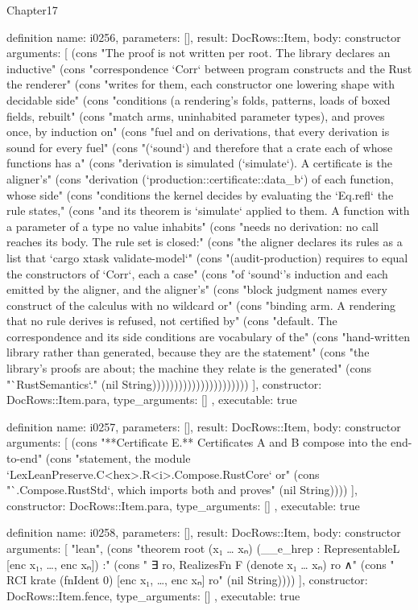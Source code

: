 \begin{lexlean}{Chapter17}
\begin{semanticmodule}
definition{
  name: i0256,
  parameters: [],
  result: DocRows::Item,
  body: constructor{
    arguments: [
      (cons "The proof is not written per root. The library declares an inductive" (cons "correspondence `Corr` between program constructs and the Rust the renderer" (cons "writes for them, each constructor one lowering shape with decidable side" (cons "conditions (a rendering's folds, patterns, loads of boxed fields, rebuilt" (cons "match arms, uninhabited parameter types), and proves once, by induction on" (cons "fuel and on derivations, that every derivation is sound for every fuel" (cons "(`sound`) and therefore that a crate each of whose functions has a" (cons "derivation is simulated (`simulate`). A certificate is the aligner's" (cons "derivation (`production::certificate::data_b`) of each function, whose side" (cons "conditions the kernel decides by evaluating the `Eq.refl` the rule states," (cons "and its theorem is `simulate` applied to them. A function with a parameter of a type no value inhabits" (cons "needs no derivation: no call reaches its body. The rule set is closed:" (cons "the aligner declares its rules as a list that `cargo xtask validate-model`" (cons "(audit-production) requires to equal the constructors of `Corr`, each a case" (cons "of `sound`'s induction and each emitted by the aligner, and the aligner's" (cons "block judgment names every construct of the calculus with no wildcard or" (cons "binding arm. A rendering that no rule derives is refused, not certified by" (cons "default. The correspondence and its side conditions are vocabulary of the" (cons "hand-written library rather than generated, because they are the statement" (cons "the library's proofs are about; the machine they relate is the generated" (cons "`RustSemantics`." (nil String))))))))))))))))))))))
    ],
    constructor: DocRows::Item.para,
    type_arguments: []
  },
  executable: true
}

definition{
  name: i0257,
  parameters: [],
  result: DocRows::Item,
  body: constructor{
    arguments: [
      (cons "**Certificate E.** Certificates A and B compose into the end-to-end" (cons "statement, the module `LexLeanPreserve.C<hex>.R<i>.Compose.RustCore` or" (cons "`.Compose.RustStd`, which imports both and proves" (nil String))))
    ],
    constructor: DocRows::Item.para,
    type_arguments: []
  },
  executable: true
}

definition{
  name: i0258,
  parameters: [],
  result: DocRows::Item,
  body: constructor{
    arguments: [
      "lean",
      (cons "theorem root (x₁ … xₙ) (__e_hrep : RepresentableL [enc x₁, …, enc xₙ]) :" (cons "    ∃ ro, RealizesFn F (denote x₁ … xₙ) ro ∧" (cons "      RCI krate (fnIdent 0) [enc x₁, …, enc xₙ] ro" (nil String))))
    ],
    constructor: DocRows::Item.fence,
    type_arguments: []
  },
  executable: true
}


\end{semanticmodule}
\end{lexlean}
